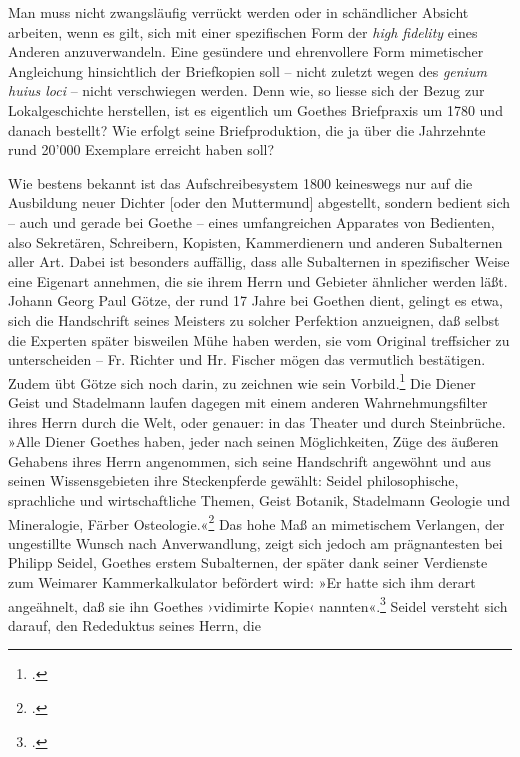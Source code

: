 \documentclass[a4paper,12pt]{article}
\newcommand{\anf}[1]{»#1«}
\newcommand{\inanf}[1]{›#1‹}
\newcommand{\st}[1]{#1}
\begin{document}

Man muss nicht zwangsläufig verrückt werden oder in schändlicher Absicht arbeiten, wenn es gilt, sich mit einer spezifischen Form der \emph{high fidelity} eines Anderen anzuverwandeln. Eine gesündere und ehrenvollere Form mimetischer Angleichung hinsichtlich der Briefkopien soll – nicht zuletzt wegen des \emph{genium huius loci} – nicht verschwiegen werden. Denn wie, so liesse sich der Bezug zur Lokalgeschichte herstellen, ist es eigentlich um Goethes Briefpraxis um 1780 und danach bestellt? Wie erfolgt seine Briefproduktion, die ja über die Jahrzehnte rund 20'000 Exemplare erreicht haben soll? 


Wie bestens bekannt ist das Aufschreibesystem 1800 keineswegs nur auf die Ausbildung neuer Dichter [\st{oder den Muttermund}] abgestellt, sondern bedient sich – auch und gerade bei Goethe – eines umfangreichen Apparates von Bedienten, also Sekretären, Schreibern, Kopisten, Kammerdienern und anderen Subalternen aller Art. Dabei ist besonders auffällig, dass alle Subalternen in spezifischer Weise eine Eigenart annehmen, die sie ihrem Herrn und Gebieter ähnlicher werden läßt. Johann Georg Paul Götze, der rund 17 Jahre bei Goethen dient, gelingt es etwa, sich die Handschrift seines Meisters zu solcher Perfektion anzueignen, daß selbst die Experten später bisweilen Mühe haben werden, sie vom Original treffsicher zu unterscheiden – Fr. Richter und Hr. Fischer mögen das vermutlich bestätigen. Zudem übt Götze sich noch darin, zu zeichnen wie sein Vorbild.\footcites[S.~100]{schleif:1965}[Mit dem Bestreben, die Handschrift des Herrn nachzuahmen, stehen Goethes Domestiken keineswegs allein. Auch in den Privatlabors im viktorianischen England, wo die Domestiken zu Laborassistenten werden, findet sich diese Tendenz, so bei Sir William Crookes Diener: \anf{Even Giminghams handwriting became more like Crooke's.}][S.~330]{gay:1996} Die Diener Geist und Stadelmann laufen dagegen mit einem anderen Wahrnehmungsfilter ihres Herrn durch die Welt, oder genauer: in das Theater und durch Steinbrüche. \anf{Alle Diener Goethes haben, jeder nach seinen Möglichkeiten, Züge des äußeren Gehabens ihres Herrn angenommen, sich seine Handschrift angewöhnt und aus seinen Wissensgebieten ihre Steckenpferde gewählt: Seidel\index{Seidel, Philipp} philosophische, sprachliche und wirtschaftliche Themen, Geist Botanik, Stadelmann Geologie und Mineralogie, Färber\index{Färber, Michael} Osteologie.}\footcite[S.~222]{schleif:1965} Das hohe Maß an mimetischem Verlangen, der ungestillte Wunsch nach Anverwandlung, zeigt sich jedoch am prägnantesten bei Philipp Seidel, Goethes erstem Subalternen, der später dank seiner Verdienste zum Weimarer Kammerkalkulator befördert wird: \anf{Er hatte sich ihm derart angeähnelt, daß sie ihn Goethes \inanf{vidimirte Kopie} nannten}.\footcite[S.~28]{schleif:1965} Seidel versteht sich darauf, den Rededuktus seines Herrn, die 
\end{document}
